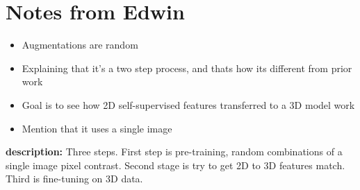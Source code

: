 \documentclass[10pt,twocolumn,letterpaper]{article}
\begin{document}
\section{Notes from Edwin}

\begin{itemize}
    \item Augmentations are random
    \item Explaining that it's a two step process, and thats how its different from prior work
    \item Goal is to see how 2D self-supervised features transferred to a 3D model work
    \item Mention that it uses a single image
\end{itemize}

\textbf{description:} Three steps. First step is pre-training, random combinations of a single image pixel contrast. Second stage is try to get 2D to 3D features match. Third is fine-tuning on 3D data.
\end{document}

